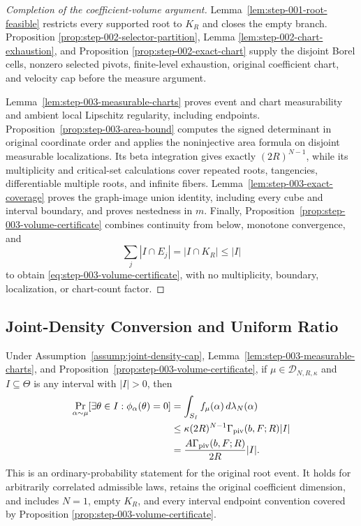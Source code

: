 \begin{proof}[Completion of the coefficient-volume argument]
Lemma~\ref{lem:step-001-root-feasible} restricts every supported root to
$K_R$ and closes the empty branch.  Proposition
\ref{prop:step-002-selector-partition}, Lemma
\ref{lem:step-002-chart-exhaustion}, and Proposition
\ref{prop:step-002-exact-chart} supply the disjoint Borel cells, nonzero
selected pivots, finite-level exhaustion, original coefficient chart, and
velocity cap before the measure argument.

Lemma~\ref{lem:step-003-measurable-charts} proves event and chart
measurability and ambient local Lipschitz regularity, including endpoints.
Proposition~\ref{prop:step-003-area-bound} computes the signed determinant
in original coordinate order and applies the noninjective area formula on
disjoint measurable localizations.  Its beta integration gives exactly
$(2R)^{N-1}$, while its multiplicity and critical-set calculations cover
repeated roots, tangencies, differentiable multiple roots, and infinite
fibers.  Lemma~\ref{lem:step-003-exact-coverage} proves the graph-image
union identity, including every cube and interval boundary, and proves
nestedness in $m$.  Finally,
Proposition~\ref{prop:step-003-volume-certificate} combines continuity from
below, monotone convergence, and
\[
\sum_j|I\cap E_j|=|I\cap K_R|\leq|I|
\]
to obtain \eqref{eq:step-003-volume-certificate}, with no multiplicity,
boundary, localization, or chart-count factor.
\end{proof}

\subsection{Joint-Density Conversion and Uniform Ratio}
\label{app:step-004}

\begin{proposition}
\label{prop:step-004-density-conversion}
Under Assumption~\ref{assump:joint-density-cap},
Lemma~\ref{lem:step-003-measurable-charts}, and
Proposition~\ref{prop:step-003-volume-certificate}, if
$\mu\in\mathcal D_{N,R,\kappa}$ and $I\subseteq\Theta$ is any interval with
$|I|>0$, then
\begin{equation}
\begin{aligned}
\Pr_{\alpha\sim\mu}\!\left[
  \exists\theta\in I:\phi_\alpha(\theta)=0
\right]
&=\int_{S_I}f_\mu(\alpha)\,d\lambda_N(\alpha)\\
&\leq
\kappa(2R)^{N-1}\Gamma_{\rm piv}(b,F;R)|I|\\
&=\frac{A\Gamma_{\rm piv}(b,F;R)}{2R}|I|.
\end{aligned}
\label{eq:step-004-density-conversion}
\end{equation}
This is an ordinary-probability statement for the original root event.  It
holds for arbitrarily correlated admissible laws, retains the original
coefficient dimension, and includes $N=1$, empty $K_R$, and every interval
endpoint convention covered by Proposition
\ref{prop:step-003-volume-certificate}.
\end{proposition}

